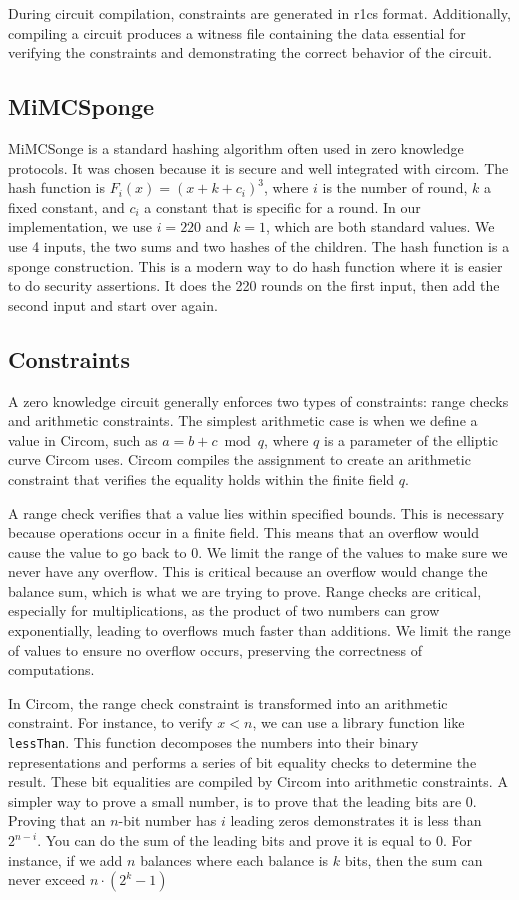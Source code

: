    During circuit compilation, constraints are generated in r1cs format. Additionally, compiling a circuit produces a witness file containing the data essential for verifying the constraints and demonstrating the correct behavior of the circuit.


\subsection{MiMCSponge} 
MiMCSonge is a standard hashing algorithm often used in zero knowledge protocols. It was chosen because it is secure and well integrated with circom.
The hash function is $F_i(x) = (x + k + c_i)^3$, where $i$ is the number of round, $k$ a fixed constant, and $c_i$ a constant that is specific for a round.
In our implementation, we use $i = 220$ and $k = 1$, which are both standard values. We use 4 inputs, the two sums and two hashes of the children. 
The hash function is a sponge construction. This is a modern way to do hash function where it is easier to do security assertions. 
It does the 220 rounds on the first input, then add the second input and start over again.



\subsection{Constraints} 


A zero knowledge circuit generally enforces two types of constraints: range checks and arithmetic constraints. 
The simplest arithmetic case is when we define a value in Circom, such as $a = b + c \bmod q$, where $q$ is a parameter of the elliptic curve Circom uses. 
Circom compiles the assignment to create an arithmetic constraint that verifies the equality holds within the finite field $q$.

A range check verifies that a value lies within specified bounds. This is necessary because operations occur in a finite field. This means that an overflow would cause the value to go back to 0.
We limit the range of the values to make sure we never have any overflow. This is critical because an overflow would change the balance sum, which is what we are trying to prove.
Range checks are critical, especially for multiplications, as the product of two numbers can grow exponentially, leading to overflows much faster than additions.
We limit the range of values to ensure no overflow occurs, preserving the correctness of computations.

In Circom, the range check constraint is transformed into an arithmetic constraint. 
For instance, to verify $x < n$, we can use a library function like \texttt{lessThan}. 
This function decomposes the numbers into their binary representations and performs a series of bit equality checks to determine the result. 
These bit equalities are compiled by Circom into arithmetic constraints. 
A simpler way to prove a small number, is to prove that the leading bits are 0. Proving that an $n$-bit number has $i$ leading zeros demonstrates it is less than $2^{n-i}$. 
You can do the sum of the leading bits and prove it is equal to 0.
For instance, if we add $n$ balances where each balance is $k$ bits, then the sum can never exceed $n \cdot (2^k - 1)$

